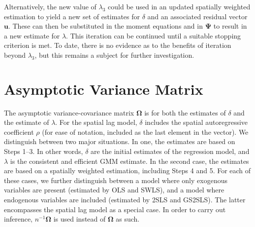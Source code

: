 \documentclass{article}
\begin{document}
Alternatively, the new value of $\lambda_3$ could be used in an updated spatially
weighted estimation to yield a new set of estimates for $\delta$ and an associated
residual vector $\mathbf{u}$. These can then be substituted in the moment equations
and in $\mathbf{\Psi}$ to result in a new estimate for $\lambda$. This iteration can be continued
until a suitable stopping criterion is met. To date, there is no evidence as to the 
benefits of iteration beyond $\lambda_3$, but this remains a subject for further investigation.

\section{Asymptotic Variance Matrix}
The asymptotic variance-covariance matrix $\mathbf{\Omega}$ is for both the estimates of $\delta$ and the
estimate of $\lambda$. For the spatial lag model, $\delta$ includes the spatial
autoregressive coefficient $\rho$ (for ease of notation, included as the last element 
in the vector). We distinguish between two major situations. In one, the estimates are
based on Steps 1--3. In other words, $\delta$ are the initial estimates of the regression
model, and $\lambda$ is the consistent and efficient GMM estimate. In the second
case, the estimates are based on a spatially weighted estimation, including 
Steps 4 and 5. For each of these cases, we further distinguish between a model
where only exogenous variables are present (estimated by OLS and SWLS), and
a model where endogenous variables are included (estimated by 2SLS and
GS2SLS). The latter encompasses the spatial lag model as a special case.
In order to carry out inference, $n^{-1} \mathbf{\Omega}$ is used instead of
 $\mathbf{\Omega}$ as such.
\end{document}
